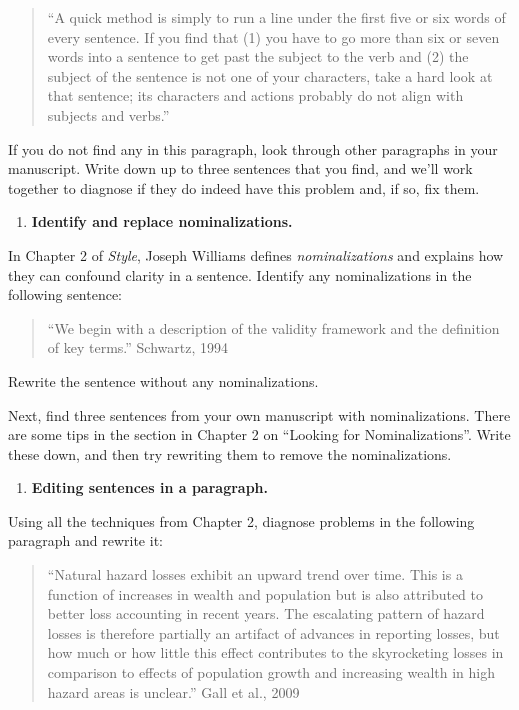 \documentclass[]{tufte-book}
\providecommand{\tightlist}{%
  \setlength{\itemsep}{0pt}\setlength{\parskip}{0pt}}
\begin{document}
\begin{quote}
``A quick method is simply to run a line under the first five or six words of
every sentence. If you find that (1) you have to go more than six or seven words
into a sentence to get past the subject to the verb and (2) the subject of the
sentence is not one of your characters, take a hard look at that sentence; its
characters and actions probably do not align with subjects and verbs.''
\end{quote}

If you do not find any in this paragraph, look through other paragraphs in your
manuscript. Write down up to three sentences that you find, and we'll work together
to diagnose if they do indeed have this problem and, if so, fix them.

\begin{enumerate}
\def\labelenumi{\arabic{enumi}.}
\setcounter{enumi}{5}
\tightlist
\item
  \textbf{Identify and replace nominalizations.}
\end{enumerate}

In Chapter 2 of \emph{Style}, Joseph Williams defines \emph{nominalizations} and explains how
they can confound clarity in a sentence. Identify any nominalizations in the following
sentence:

\begin{quote}
``We begin with a description of the validity framework and the definition of
key terms.'' Schwartz, 1994
\end{quote}

Rewrite the sentence without any nominalizations.

Next, find three sentences from your own manuscript with nominalizations. There
are some tips in the section in Chapter 2 on ``Looking for Nominalizations''.
Write these down, and then try rewriting them to remove the nominalizations.

\begin{enumerate}
\def\labelenumi{\arabic{enumi}.}
\setcounter{enumi}{6}
\tightlist
\item
  \textbf{Editing sentences in a paragraph.}
\end{enumerate}

Using all the techniques from Chapter 2, diagnose problems in the following
paragraph and rewrite it:

\begin{quote}
``Natural hazard losses exhibit an upward trend over time. This is a function
of increases in wealth and population but is also attributed to better loss
accounting in recent years. The escalating pattern of hazard losses is therefore
partially an artifact of advances in reporting losses, but how much or how
little this effect contributes to the skyrocketing losses in comparison to
effects of population growth and increasing wealth in high hazard areas is
unclear.'' Gall et al., 2009
\end{quote}
\end{document}
